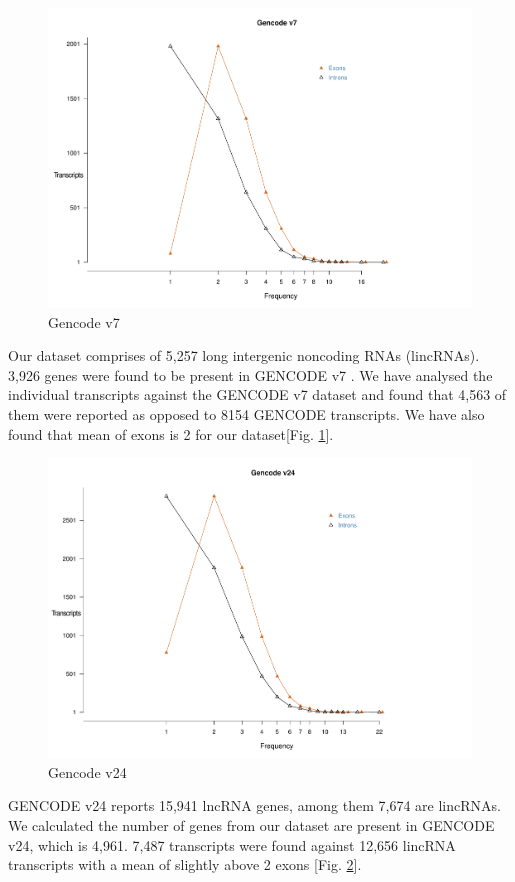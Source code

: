 \documentclass[ncrna,article,submit,moreauthors,pdftex,10pt,a4paper]{mdpi}
\begin{document}
 \begin{figure}[h]
  \centering
  \includegraphics[width=\linewidth]{Gencode_v7_replot.pdf}
  \caption{Gencode v7}
  \label{f1}
 \end{figure}

Our dataset comprises of 5,257 long intergenic noncoding RNAs (lincRNAs). 3,926 genes were found to be present in GENCODE v7 \cite{harrow2012}. We have analysed the individual transcripts against the GENCODE v7 dataset and found that 4,563 of them were reported as opposed to 8154 GENCODE transcripts. We have also found that mean of exons is 2 for our dataset[Fig. \ref{f1}].

 \begin{figure}
  \centering
  \includegraphics[width=\linewidth]{Gencode_v24_replot.pdf}
  \caption{Gencode v24}
  \label{f2} 
 \end{figure}
 
GENCODE v24 reports 15,941 lncRNA genes, among them 7,674 are lincRNAs. We calculated the number of genes from our dataset are present in GENCODE v24, which is 4,961. 7,487 transcripts were found against 12,656 lincRNA transcripts with a mean of slightly above 2 exons [Fig. \ref{f2}].



\end{document}
